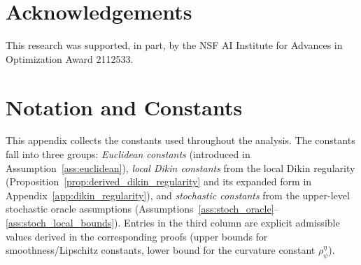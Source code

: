 \documentclass{article}
\begin{document}
\section*{Acknowledgements}
This research was supported, in part, by the NSF AI Institute for Advances in Optimization Award 2112533.







\clearpage

\appendix

\section{Notation and Constants}\label{app:notation}

This appendix collects the constants used throughout the analysis. The constants
fall into three groups: \emph{Euclidean constants} (introduced in
Assumption~\ref{ass:euclidean}), \emph{local Dikin constants} from the
local Dikin regularity (Proposition~\ref{prop:derived_dikin_regularity} and its
expanded form in Appendix~\ref{app:dikin_regularity}), and \emph{stochastic
constants} from the upper-level stochastic oracle assumptions
(Assumptions~\ref{ass:stoch_oracle}--\ref{ass:stoch_local_bounds}). Entries
in the third column are explicit admissible values derived in the corresponding
proofs (upper bounds for smoothness/Lipschitz constants, lower bound for the
curvature constant $\rho_\psi^\eta$).
\end{document}
